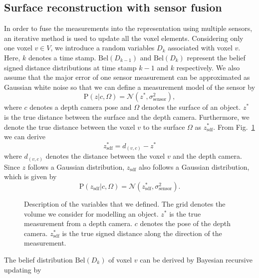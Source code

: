 \subsection{Surface reconstruction with sensor fusion}
In order to fuse the measurements into the representation using multiple sensors, an iterative method is used to update all the voxel elements. Considering only one voxel $v\in V$, we introduce a  random variables $D_{k}$ associated with voxel $v$. Here, $k$ denotes a time stamp. $\text{Bel}(D_{k-1})$ and $\text{Bel}(D_{k})$ represent the belief signed distance distributions at time stamp $k-1$ and $k$ respectively. We also assume that the major error of one sensor measurement can be approximated as Gaussian white noise so that we can define a measurement model of the sensor by 
\begin{equation}
\text{P}(z|c,\Omega) = \mathcal{N}(z^*,  \sigma_\text{sensor}^2), 
\end{equation}
where $c$ denotes a depth camera pose and $\Omega$ denotes the surface of an object. $z^*$ is the true distance between the surface and the depth camera. Furthermore, we denote the true distance between the voxel $v$ to the surface $\Omega$ as $z_\text{sdf}^*$. From Fig.~\ref{fig:sdf} we can derive 
\begin{equation}
z_\text{sdf}^*  = d_{( v,c) } - z^*
\end{equation}
where $d_{( v,c) }$ denotes the distance between the voxel $v$ and the depth camera. Since $z$ follows a Gaussian distribution, $z_\text{sdf}$ also follows a Gaussian distribution, which is given by 
\begin{equation}
\text{P}(z_\text{sdf}|c,\Omega) = \mathcal{N}(z_\text{sdf}^*,  \sigma_\text{sensor}^2).
\end{equation}

\begin{figure}[!htbp]
\centering
\def\svgwidth{0.8\linewidth}

\caption{Description of the variables that we defined. The grid denotes the volume we consider for modelling an object. $z^*$ is the true measurement from a depth camera. $c$ denotes the pose of the depth camera. $ z_\text{sdf}^*$ is the true signed distance along the direction of the measurement.}
\label{fig:sdf}
\end{figure}	

The belief distribution  $\text{Bel}(D_{k})$ of voxel $v$ can be derived by Bayesian recursive updating by   


